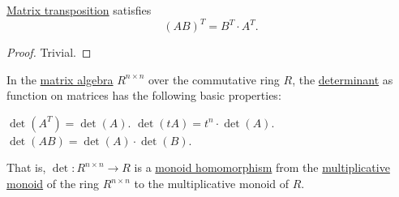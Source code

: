 \begin{proposition}\label{thm:transpose_matrix_contravariant}
  \hyperref[def:transpose_matrix]{Matrix transposition} satisfies
  \begin{equation}\label{eq:thm:transpose_matrix_contravariant}
    (AB)^T = B^T \cdot A^T.
  \end{equation}
\end{proposition}
\begin{proof}
  Trivial.
\end{proof}

\begin{proposition}\label{thm:def:matrix_determinant}
  In the \hyperref[thm:matrix_algebra]{matrix algebra} \( R^{n \times n} \) over the commutative ring \( R \), the \hyperref[def:matrix_determinant]{determinant} as function on matrices has the following basic properties:
  \begin{thmenum}
     \( \det(A^T) = \det(A) \).
     \( \det(tA) = t^n \cdot \det(A) \).
     \( \det(AB) = \det(A) \cdot \det(B) \).

    That is, \( \det: R^{n \times n} \to R \) is a \hyperref[def:monoid/morphism]{monoid homomorphism} from the \hyperref[def:semiring]{multiplicative monoid} of the ring \( R^{n \times n} \) to the multiplicative monoid of \( R \).
  \end{thmenum}
\end{proposition}

